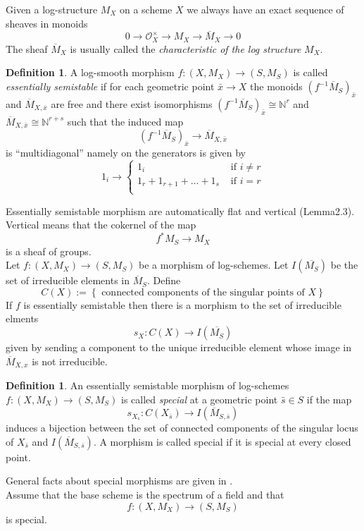\documentclass{amsart}
\theoremstyle{definition}
\newtheorem{definition}[thm]{Definition}
\numberwithin{equation}{section}
\begin{document}
\noindent Given a log-structure $M_X$ on a scheme $X$ we always have an exact sequence of sheaves in monoids
$$
0{\rightarrow} {\mathcal{O}}_X^{\times}{\rightarrow} M_X{\rightarrow} \overline{M}_X{\rightarrow} 0
$$
\noindent The sheaf $\overline{M}_X$ is usually called the \emph{characteristic of the log structure} $M_X$.\\

\begin{definition}\label{semistablemorphism}
    A log-smooth morphism $f:(X,M_X){\rightarrow} (S,M_S)$ is called \emph{ essentially semistable} if for each geometric point $\bar{x}{\rightarrow} X$ the monoids $(f^{-1}\overline{M}_S)_{\bar{x}}$ and $\overline{M}_{X,\bar{x}}$ are free and there exist isomorphisms $(f^{-1}\overline{M}_S)_{\bar{x}}\cong{\mathbb{N}}^r$ and $\overline{M}_{X,\bar{x}}\cong{\mathbb{N}}^{r+s}$ such that the induced map
$$
(f^{-1}\overline{M}_S)_{\bar{x}}{\rightarrow}\overline{M}_{X,\bar{x}}
$$
\noindent is ``multidiagonal'' namely on the generators is given by
$$
1_i{\rightarrow} \left\{
\begin{array}{cc}
1_i & \mbox{ if }i\neq r\\
1_r+1_{r+1}+\dots +1_s & \mbox{ if }i= r\\
\end{array}
\right.
$$
\end{definition}

\noindent Essentially semistable morphism are automatically flat and vertical (\cite{olun}Lemma2.3).\\ Vertical means that the cokernel of the map
$$
f^{*}M_S{\rightarrow} M_X
$$
\noindent is a sheaf of groups.\\
Let $f:(X,M_X){\rightarrow} (S,M_S)$ be a morphism of log-schemes. Let $I(\overline{M_S})$ be the set of irreducible elements in $\overline{M}_S$. Define 
$$
C(X):=\left\{\mbox{ connected components of the singular points of }X\right\}
$$
\noindent If $f$ is essentially semistable then there is a morphism to the set of irreducible elments
$$
s_X:C(X){\rightarrow} I(\overline{M_S})
$$
\noindent given by sending a component to the unique irreducible element whose image in $\overline{M}_{X,x}$ is not irreducible.\\

\begin{definition}\label{specialmorphism}
An essentially semistable morphism of log-schemes $f:(X,M_X){\rightarrow} (S,M_S)$ is called \emph{special} at a geometric point $\bar{s}\in S$ if the map
$$
s_{X_{\bar{s}}}:C(X_{\bar{s}}){\rightarrow} I(\overline{M}_{S,\bar{s}})
$$
induces a bijection between the set of connected components of the singular locus of $X_{\bar{s}}$ and $I(\overline{M}_{S,\bar{s}})$. A morphism is called special if it is special at every closed point.
\end{definition}
\noindent General facts about special morphisms are given in \cite{olun}.\\
\noindent Assume that the base scheme is the spectrum of a field and that 
$$
f:(X,M_X){\rightarrow} (S,M_S)
$$
\noindent is special.\\
\end{document}
